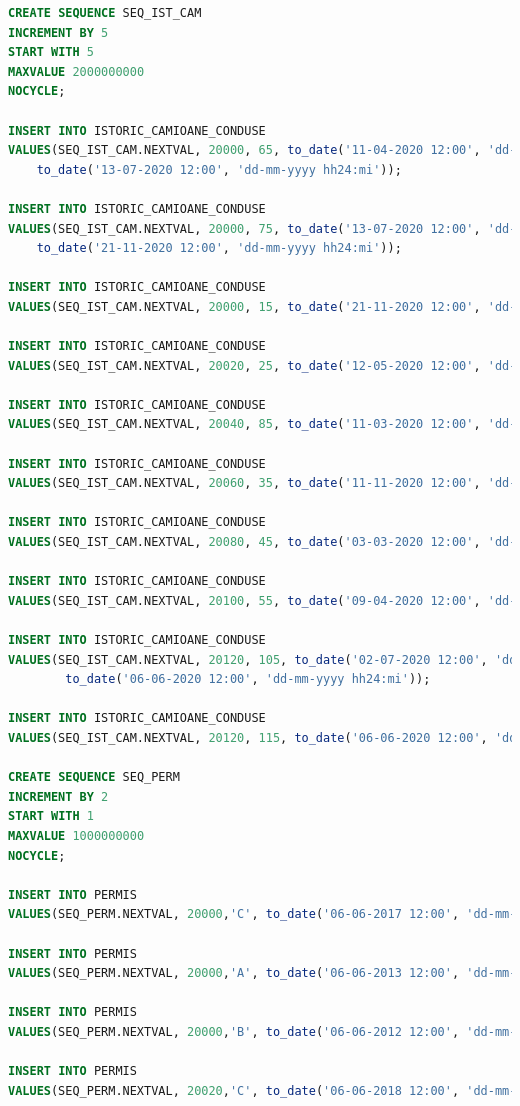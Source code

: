 \documentclass[12pt, a4paper]{article}
\begin{document}
\begin{lstlisting}[language=SQL]
CREATE SEQUENCE SEQ_IST_CAM
INCREMENT BY 5
START WITH 5
MAXVALUE 2000000000
NOCYCLE;

INSERT INTO ISTORIC_CAMIOANE_CONDUSE
VALUES(SEQ_IST_CAM.NEXTVAL, 20000, 65, to_date('11-04-2020 12:00', 'dd-mm-yyyy hh24:mi'), 
    to_date('13-07-2020 12:00', 'dd-mm-yyyy hh24:mi'));

INSERT INTO ISTORIC_CAMIOANE_CONDUSE
VALUES(SEQ_IST_CAM.NEXTVAL, 20000, 75, to_date('13-07-2020 12:00', 'dd-mm-yyyy hh24:mi'), 
    to_date('21-11-2020 12:00', 'dd-mm-yyyy hh24:mi'));

INSERT INTO ISTORIC_CAMIOANE_CONDUSE
VALUES(SEQ_IST_CAM.NEXTVAL, 20000, 15, to_date('21-11-2020 12:00', 'dd-mm-yyyy hh24:mi'), null);

INSERT INTO ISTORIC_CAMIOANE_CONDUSE
VALUES(SEQ_IST_CAM.NEXTVAL, 20020, 25, to_date('12-05-2020 12:00', 'dd-mm-yyyy hh24:mi'), null);

INSERT INTO ISTORIC_CAMIOANE_CONDUSE
VALUES(SEQ_IST_CAM.NEXTVAL, 20040, 85, to_date('11-03-2020 12:00', 'dd-mm-yyyy hh24:mi'), null);

INSERT INTO ISTORIC_CAMIOANE_CONDUSE
VALUES(SEQ_IST_CAM.NEXTVAL, 20060, 35, to_date('11-11-2020 12:00', 'dd-mm-yyyy hh24:mi'), null);

INSERT INTO ISTORIC_CAMIOANE_CONDUSE
VALUES(SEQ_IST_CAM.NEXTVAL, 20080, 45, to_date('03-03-2020 12:00', 'dd-mm-yyyy hh24:mi'), null);

INSERT INTO ISTORIC_CAMIOANE_CONDUSE
VALUES(SEQ_IST_CAM.NEXTVAL, 20100, 55, to_date('09-04-2020 12:00', 'dd-mm-yyyy hh24:mi'), null);

INSERT INTO ISTORIC_CAMIOANE_CONDUSE
VALUES(SEQ_IST_CAM.NEXTVAL, 20120, 105, to_date('02-07-2020 12:00', 'dd-mm-yyyy hh24:mi'), 
        to_date('06-06-2020 12:00', 'dd-mm-yyyy hh24:mi'));

INSERT INTO ISTORIC_CAMIOANE_CONDUSE
VALUES(SEQ_IST_CAM.NEXTVAL, 20120, 115, to_date('06-06-2020 12:00', 'dd-mm-yyyy hh24:mi'), null);

CREATE SEQUENCE SEQ_PERM
INCREMENT BY 2
START WITH 1
MAXVALUE 1000000000
NOCYCLE;

INSERT INTO PERMIS
VALUES(SEQ_PERM.NEXTVAL, 20000,'C', to_date('06-06-2017 12:00', 'dd-mm-yyyy hh24:mi'));

INSERT INTO PERMIS
VALUES(SEQ_PERM.NEXTVAL, 20000,'A', to_date('06-06-2013 12:00', 'dd-mm-yyyy hh24:mi'));

INSERT INTO PERMIS
VALUES(SEQ_PERM.NEXTVAL, 20000,'B', to_date('06-06-2012 12:00', 'dd-mm-yyyy hh24:mi'));

INSERT INTO PERMIS
VALUES(SEQ_PERM.NEXTVAL, 20020,'C', to_date('06-06-2018 12:00', 'dd-mm-yyyy hh24:mi'));


\end{lstlisting}
\end{document}
